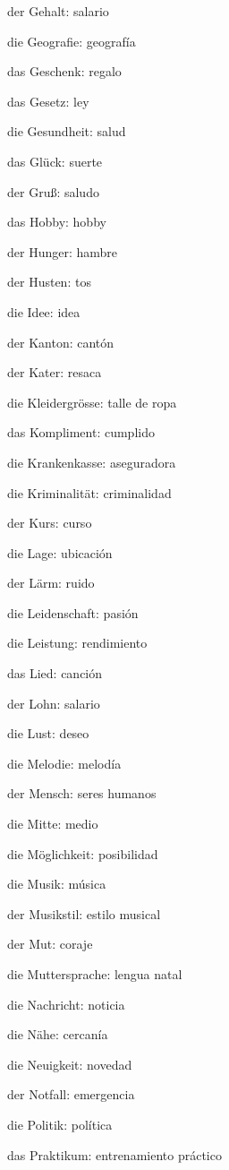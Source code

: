 \begin{multicols}{2}
\begin{myitemize}
\item der Gehalt: salario
\item die Geografie: geografía
\item das Geschenk: regalo
\item das Gesetz: ley
\item die Gesundheit: salud
\item das Glück: suerte
\item der Gruß: saludo
\item das Hobby: hobby
\item der Hunger: hambre
\item der Husten: tos
\item die Idee: idea
\item der Kanton: cantón
\item der Kater: resaca
\item die Kleidergrösse: talle de ropa
\item das Kompliment: cumplido
\item die Krankenkasse: aseguradora
\item die Kriminalität: criminalidad
\item der Kurs: curso
\item die Lage: ubicación
\item der Lärm: ruido
\item die Leidenschaft: pasión
\item die Leistung: rendimiento
\item das Lied: canción
\item der Lohn: salario
\item die Lust: deseo
\item die Melodie: melodía
\item der Mensch: seres humanos
\item die Mitte: medio
\item die Möglichkeit: posibilidad
\item die Musik: música
\item der Musikstil: estilo musical
\item der Mut: coraje
\item die Muttersprache: lengua natal
\item die Nachricht: noticia
\item die Nähe: cercanía
\item die Neuigkeit: novedad
\item der Notfall: emergencia
\item die Politik: política
\item das Praktikum: entrenamiento práctico

\end{myitemize}
\end{multicols}
